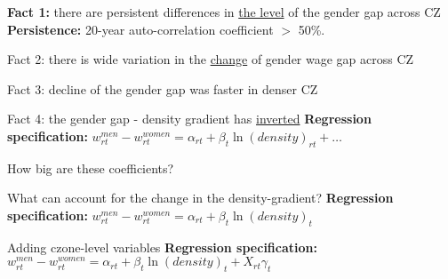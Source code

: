 \begin{frame}{\textbf{Fact 1:} there are persistent differences in \underline{the level} of the gender gap across CZ} 
\label{slide:fact1}
{\scriptsize}
\textbf{\alert{Persistence:}} 20-year auto-correlation coefficient $>$ 50\%.

\hspace{1cm} 
\end{frame}

\begin{frame}{Fact 2: there is wide variation in the \underline{change} of gender wage gap across CZ}

\end{frame}
\begin{frame}{Fact 3: decline of the gender gap was faster in denser CZ}  				
	
\end{frame}
\begin{frame}{Fact 4: the gender gap - density gradient has \underline{inverted}}
	\label{slide:baseline}
	\textbf{\alert{Regression specification:}}	$w^{men}_{rt}-w^{women}_{rt}=\alpha_{rt}+\beta_{t}\ln(density)_{rt}+ \dots$
	
 \hspace{.5cm} 		 \hspace{.5cm} 	 \hspace{.5cm}			
\end{frame}

\begin{frame}{How big are these coefficients?}  
		
\end{frame}

\begin{frame}{What can account for the change in the density-gradient?}
	\label{slide:controls}
	\textbf{\alert{Regression specification:}} $w^{men}_{rt}-w^{women}_{rt}=\alpha_{rt}+\beta_{t}\ln(density)_t$
	
\end{frame}

\begin{frame}{Adding czone-level variables}
	\label{slide:cz_controls}
	\textbf{\alert{Regression specification:}} $w^{men}_{rt}-w^{women}_{rt}=\alpha_{rt}+\beta_{t}\ln(density)_t+X_{rt}\gamma_t$
	
\end{frame}